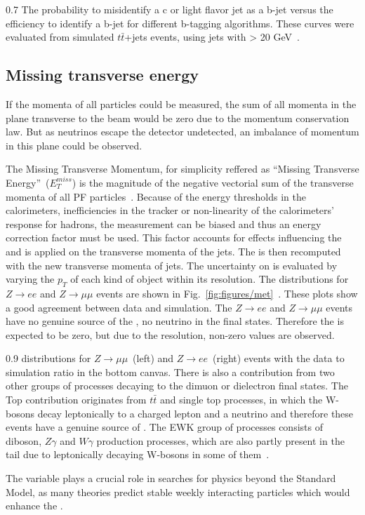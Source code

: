                  {0.7}       %
                 { The probability to misidentify a c or light flavor jet as a b-jet versus the efficiency to identify a b-jet for different b-tagging algorithms. These curves were evaluated from simulated $t\bar{t}$+jets events, using jets with \pt > 20 GeV~\cite{Sirunyan:2017ezt}. }


\subsection{Missing transverse energy~\label{sec:MET}}


If the momenta of all particles could be measured, the sum of all momenta in the plane transverse to the beam would be zero due to the momentum conservation law. But as neutrinos escape the detector undetected, an imbalance of momentum in this plane could be observed. 

The Missing Transverse Momentum, for simplicity reffered as ``Missing Transverse Energy''~($E_{T}^{miss}$) is the magnitude of the negative vectorial sum of the transverse momenta of all PF particles~\cite{CMS:2016ljj}. Because of the energy thresholds in the calorimeters, inefficiencies in the tracker or non-linearity of the calorimeters' response for hadrons, the \MET measurement can be biased and thus an energy correction factor must be used. This factor accounts for effects influencing the \MET and is applied on the transverse momenta of the jets. The \MET is then recomputed with the new transverse momenta of jets. The uncertainty on \MET is evaluated by varying the $p_{T}$ of each kind of object within its resolution. The  \MET  distributions for  $Z \rightarrow ee$ and $Z \rightarrow \mu \mu$ events are shown in Fig.~\ref{fig:figures/met}~\cite{CMS:2016ljj}. These plots show a good agreement between data and simulation. The $Z \rightarrow ee$ and $Z \rightarrow \mu \mu$ events have no genuine source of the \MET , no neutrino in the final states. Therefore the \MET is expected to be zero, but due to the \MET resolution, non-zero values are observed.  


                 {0.9}       %
                 { \MET distributions for $Z \rightarrow \mu \mu$~(left) and $Z \rightarrow ee$~(right) events with the data to simulation ratio in the bottom canvas. There is also a contribution from two other groups of processes decaying to the dimuon or dielectron final states. The Top contribution originates from $t\bar{t}$ and single top processes, in which the W-bosons decay leptonically to a charged lepton and a neutrino and therefore these events have a genuine source of \MET. The EWK group of processes consists of diboson, $Z\gamma$ and $W\gamma$ production processes, which are also partly present in the \MET tail due to leptonically decaying W-bosons in some of them~\cite{CMS:2016ljj}. }

The \MET variable plays a crucial role in searches for physics beyond the Standard Model, as many theories predict stable weekly interacting particles which would enhance the \MET.




